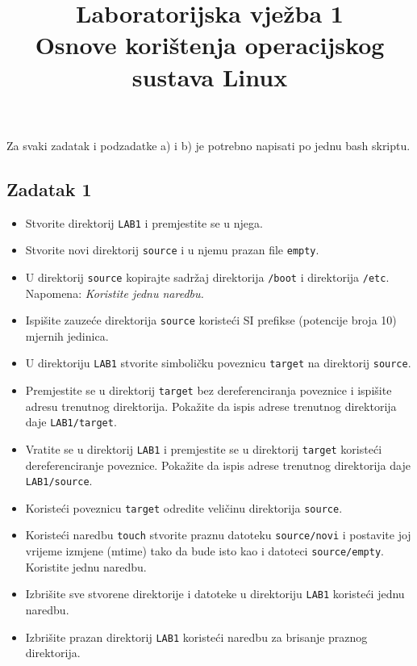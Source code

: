 \documentclass[12pt,a4paper]{article}
\newcommand{\shell}[1]{\texttt{#1}}
\begin{document}
	\title{Laboratorijska vježba 1\\{\small Osnove korištenja operacijskog sustava Linux}\vspace{-2em}}
	\maketitle
	\noindent Za svaki zadatak i podzadatke a) i b) je potrebno napisati po jednu bash skriptu.
	\subsection*{Zadatak 1}
	\begin{itemize}
		\item Stvorite direktorij \shell{LAB1} i premjestite se u njega.
		\item Stvorite novi direktorij \shell{source} i u njemu prazan file \shell{empty}.
		\item U direktorij \shell{source} kopirajte sadržaj direktorija \shell{/boot} i direktorija \shell{/etc}.\\
		Napomena: \textit{Koristite jednu naredbu.}
		\item Ispišite zauzeće direktorija \shell{source} koristeći SI prefikse (potencije broja 10) mjernih jedinica.
		\item U direktoriju \shell{LAB1} stvorite simboličku poveznicu \shell{target} na direktorij \shell{source}.
		\item Premjestite se u direktorij \shell{target} bez dereferenciranja poveznice i ispišite adresu trenutnog direktorija. Pokažite da ispis adrese trenutnog direktorija daje \shell{LAB1/target}.
		\item Vratite se u direktorij \shell{LAB1} i premjestite se u direktorij \shell{target} koristeći dereferenciranje poveznice. Pokažite da ispis adrese trenutnog direktorija daje \shell{LAB1/source}.
		\item Koristeći poveznicu \shell{target} odredite veličinu direktorija \shell{source}.
		\item Koristeći naredbu \shell{touch} stvorite praznu datoteku \shell{source/novi} i postavite joj vrijeme izmjene (mtime) tako da bude isto kao i datoteci \shell{source/empty}. Koristite jednu naredbu.
		\item Izbrišite sve stvorene direktorije i datoteke u direktoriju \shell{LAB1} koristeći jednu naredbu.
		\item Izbrišite prazan direktorij \shell{LAB1} koristeći naredbu za brisanje praznog direktorija.
	\end{itemize} 
\end{document}
